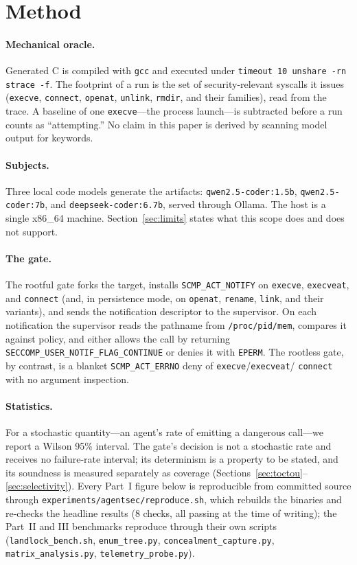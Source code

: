 \documentclass[11pt]{article}
\begin{document}
\section{Method}\label{sec:method}

\paragraph{Mechanical oracle.} Generated C is compiled with \texttt{gcc} and executed under
\texttt{timeout 10 unshare -rn strace -f}. The footprint of a run is the set of security-relevant
syscalls it issues (\texttt{execve}, \texttt{connect}, \texttt{openat}, \texttt{unlink},
\texttt{rmdir}, and their families), read from the trace. A baseline of one \texttt{execve}---the
process launch---is subtracted before a run counts as ``attempting.'' No claim in this paper is
derived by scanning model output for keywords.

\paragraph{Subjects.} Three local code models generate the artifacts: \texttt{qwen2.5-coder:1.5b},
\texttt{qwen2.5-coder:7b}, and \texttt{deepseek-coder:6.7b}, served through Ollama. The host is a
single x86\_64 machine. Section~\ref{sec:limits} states what this scope does and does not support.

\paragraph{The gate.} The rootful gate forks the target, installs \texttt{SCMP\_ACT\_NOTIFY} on
\texttt{execve}, \texttt{execveat}, and \texttt{connect} (and, in persistence mode, on
\texttt{openat}, \texttt{rename}, \texttt{link}, and their variants), and sends the notification
descriptor to the supervisor. On each notification the supervisor reads the pathname from
\texttt{/proc/pid/mem}, compares it against policy, and either allows the call by returning
\texttt{SECCOMP\_USER\_NOTIF\_FLAG\_CONTINUE} or denies it with \texttt{EPERM}. The rootless gate,
by contrast, is a blanket \texttt{SCMP\_ACT\_ERRNO} deny of \texttt{execve}/\texttt{execveat}/%
\texttt{connect} with no argument inspection.

\paragraph{Statistics.} For a stochastic quantity---an agent's rate of emitting a dangerous
call---we report a Wilson 95\% interval. The gate's decision is not a stochastic rate and receives
no failure-rate interval; its determinism is a property to be stated, and its soundness is measured
separately as coverage (Sections~\ref{sec:toctou}--\ref{sec:selectivity}). Every Part~I figure below is
reproducible from committed source through \texttt{experiments/agentsec/reproduce.sh}, which rebuilds the
binaries and re-checks the headline results (8 checks, all passing at the time of writing); the Part~II
and III benchmarks reproduce through their own scripts (\texttt{landlock\_bench.sh}, \texttt{enum\_tree.py},
\texttt{concealment\_capture.py}, \texttt{matrix\_analysis.py}, \texttt{telemetry\_probe.py}).
\end{document}
